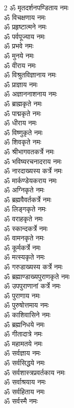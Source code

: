\begin{flushleft}
\begin{multicols}{2}
ॐ मृतदर्शनपण्डिताय नमः\\
ॐ विचक्षणाय नमः\hfill{}\\
ॐ प्रहृष्टात्मने नमः\\
ॐ पर्वपूज्याय नमः\\
ॐ प्रभवे नमः\\
ॐ मुनये नमः\\
ॐ वीराय नमः\\
ॐ विश्रुतविज्ञानाय नमः\\
ॐ प्राज्ञाय नमः\\
ॐ अज्ञाननाशनाय नमः\\
ॐ ब्राह्मकृते नमः\\
ॐ पाद्मकृते नमः\hfill{}\\
ॐ धीराय नमः\\
ॐ विष्णुकृते नमः\\
ॐ शिवकृते नमः\\
ॐ श्रीभागवतकर्त्रे नमः\\
ॐ भविष्यरचनादराय नमः\\
ॐ नारदाख्यस्य कर्त्रे नमः\\
ॐ मार्कण्डेयकराय नमः\\
ॐ अग्निकृते नमः\\
ॐ ब्रह्मवैवर्तकर्त्रे नमः\\
ॐ लिङ्गकृते नमः\hfill{}\\
ॐ वराहकृते नमः\\
ॐ स्कान्दकर्त्रे नमः\\
ॐ वामनकृते नमः\\
ॐ कूर्मकर्त्रे नमः\\
ॐ मत्स्यकृते नमः\\
ॐ गरुडाख्यस्य कर्त्रे नमः\\
ॐ ब्रह्माण्डाख्यपुराण\-कृते नमः\\
ॐ उपपुराणानां कर्त्रे नमः\\
ॐ पुराणाय नमः\\
ॐ पुरुषोत्तमाय नमः\hfill{}\\
ॐ काशिवासिने नमः\\
ॐ ब्रह्मनिधये नमः\\
ॐ गीतादात्रे नमः\\
ॐ महामतये नमः\\
ॐ सर्वज्ञाय नमः\\
ॐ सर्वसिद्धये नमः\\
ॐ सर्वशास्त्रप्रवर्तकाय नमः\\
ॐ सर्वाश्रयाय नमः\\
ॐ सर्वहिताय नमः\\
ॐ सर्वस्मै नमः\hfill{}\\

\end{multicols}
\end{flushleft}
